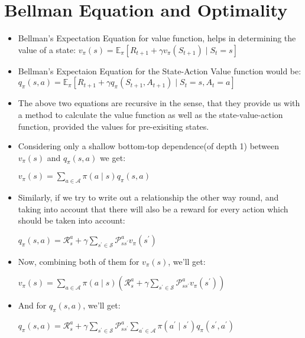 \documentclass{article}
\begin{document}
\section {Bellman Equation and Optimality}

\begin{itemize}
  \item Bellman's Expectation Equation for value function, helps in determining the value of a state: \( v_{\pi}(s)=\mathbb{E}_{\pi}\left[R_{t+1}+\gamma v_{\pi}\left(S_{t+1}\right) \mid S_{t}=s\right] \)
  \item Bellman's Expectaion Equation for the State-Action Value function would be: \( q_{\pi}(s, a)=\mathbb{E}_{\pi}\left[R_{t+1}+\gamma q_{\pi}\left(S_{t+1}, A_{t+1}\right) \mid S_{t}=s, A_{t}=a\right] \)
  \item The above two equations are recursive in the sense, that they provide us with a method to calculate the value function as well as the state-value-action function, provided the values for pre-exisiting states.
  \item Considering only a shallow bottom-top dependence(of depth 1) between $v_{\pi}(s)$ and $q_{\pi}(s,a)$ we get:  \\
  \begin{center}
    \( v_{\pi}(s)=\sum_{a \in \mathcal{A}} \pi(a \mid s) q_{\pi}(s, a) \)
  \end{center}
  \item Similarly, if we try to write out a relationship the other way round, and taking into account that there will also be a reward for every action which should be taken into account:  \\
  \begin{center}
    \( q_{\pi}(s, a)=\mathcal{R}_{s}^{a}+\gamma \sum_{s^{\prime} \in \mathcal{S}} \mathcal{P}_{s s^{\prime}}^{a} v_{\pi}\left(s^{\prime}\right) \)
  \end{center}
  \item Now, combining both of them for $v_{\pi}(s)$, we'll get: \\
  \begin{center}
    \( v_{\pi}(s)=\sum_{a \in \mathcal{A}} \pi(a \mid s)\left(\mathcal{R}_{s}^{a}+\gamma \sum_{s^{\prime} \in \mathcal{S}} \mathcal{P}_{s s^{\prime}}^{a} v_{\pi}\left(s^{\prime}\right)\right) \)
  \end{center}
  \item And for $q_{\pi}(s,a)$, we'll get:
  \begin{center}
    \( q_{\pi}(s, a)=\mathcal{R}_{s}^{a}+\gamma \sum_{s^{\prime} \in \mathcal{S}} \mathcal{P}_{s s^{\prime}}^{a} \sum_{a^{\prime} \in \mathcal{A}} \pi\left(a^{\prime} \mid s^{\prime}\right) q_{\pi}\left(s^{\prime}, a^{\prime}\right) \)
  \end{center}


\end{itemize}
\end{document}
